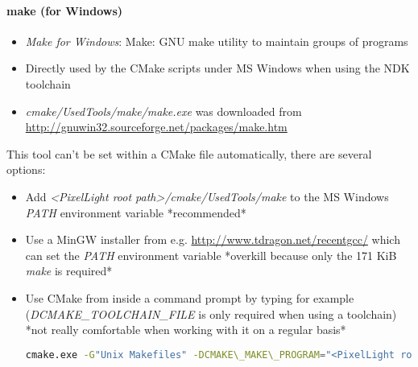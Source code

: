 \paragraph{make (for Windows)}
\begin{itemize}
\item{\emph{Make for Windows}: Make: GNU make utility to maintain groups of programs}
\item{Directly used by the CMake scripts under MS Windows when using the \ac{NDK} toolchain}
\item{\emph{cmake/UsedTools/make/make.exe} was downloaded from \url{http://gnuwin32.sourceforge.net/packages/make.htm}}
\end{itemize}
This tool can't be set within a CMake file automatically, there are several options:
\begin{itemize}
\item{Add \emph{\textless PixelLight root path\textgreater /cmake/UsedTools/make} to the MS Windows \emph{PATH} environment variable *recommended*}
\item{Use a MinGW installer from e.g. \url{http://www.tdragon.net/recentgcc/} which can set the \emph{PATH} environment variable *overkill because only the 171 KiB \emph{make} is required*}
\item{Use CMake from inside a command prompt by typing for example (\emph{DCMAKE\_TOOLCHAIN\_FILE} is only required when using a toolchain) \\ *not really comfortable when working with it on a regular basis*
\begin{lstlisting}[language=sh]
cmake.exe -G"Unix Makefiles" -DCMAKE\_MAKE\_PROGRAM="<PixelLight root path>/cmake/UsedTools/make/make.exe" -DCMAKE\_TOOLCHAIN\_FILE="<PixelLight root path>/cmake/Toolchains7Toolchain-ndk.cmake"
\end{lstlisting}
}
\end{itemize}




